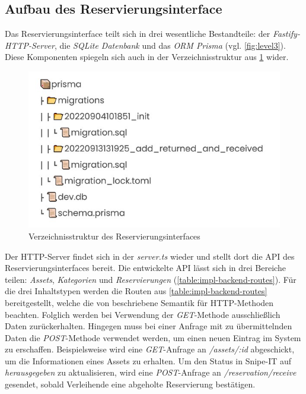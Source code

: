 \subsection{Aufbau des Reservierungsinterface}
Das Reservierungsinterface teilt sich in drei wesentliche Bestandteile: der
\textit{Fastify-HTTP-Server}, die \textit{SQLite Datenbank} und das \textit{ORM Prisma} (vgl.
\ref{fig:level3}). Diese Komponenten spiegeln sich auch in der Verzeichnisstruktur aus \ref{fig:db}
wider.

\begin{figure}[h]
  \centering
  \includegraphics[scale=0.7]{Bilder/Db.jpg}
  \caption[Verzeichnisstruktur des Reservierungsinterfaces]{Verzeichnisstruktur des Reservierungsinterfaces}
  \label{fig:db}
\end{figure}

Der HTTP-Server findet sich in der \textit{server.ts} wieder und stellt dort die API des
Reservierungsinterfaces bereit. Die entwickelte API lässt sich in drei Bereiche teilen:
\textit{Assets}, \textit{Kategorien} und \textit{Reservierungen} (\ref{table:impl-backend-routes}).
Für die drei Inhaltstypen werden die Routen aus \ref{table:impl-backend-routes} bereitgestellt,
welche die von  beschriebene Semantik für HTTP-Methoden beachten.
Folglich werden bei Verwendung der \textit{GET}-Methode ausschließlich Daten zurückerhalten.
Hingegen muss bei einer Anfrage mit zu übermittelnden Daten die \textit{POST}-Methode verwendet
werden, um einen neuen Eintrag im System zu erschaffen. Beispielsweise wird eine
\textit{GET}-Anfrage an \textit{/assets/:id} abgeschickt, um die Informationen eines Assets zu
erhalten. Um den Status in Snipe-IT auf \textit{herausgegeben} zu aktualisieren, wird eine
\textit{POST}-Anfrage an \textit{/reservation/receive} gesendet, sobald Verleihende eine abgeholte
Reservierung bestätigen.

